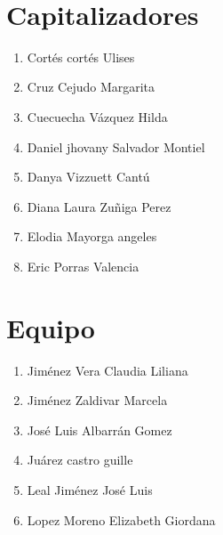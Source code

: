 

\begin{spacing}{0.5}
\ \\ 
\justifying
\begin{paracol}{2}
\section*{Capitalizadores}
\begin{enumerate}
\item Cortés cortés Ulises
\item Cruz Cejudo Margarita
\item Cuecuecha Vázquez Hilda
\item Daniel jhovany Salvador Montiel
\item Danya Vizzuett Cantú
\item Diana Laura Zuñiga Perez
\item Elodia Mayorga angeles
\item Eric Porras Valencia
\end{enumerate}
\switchcolumn
\section*{Equipo}
\begin{enumerate}
\item Jiménez Vera Claudia Liliana
\item Jiménez Zaldivar Marcela
\item José Luis Albarrán Gomez
\item Juárez castro guille
\item Leal Jiménez José Luis
\item Lopez Moreno Elizabeth Giordana
\end{enumerate}
\end{paracol}

\end{spacing}
